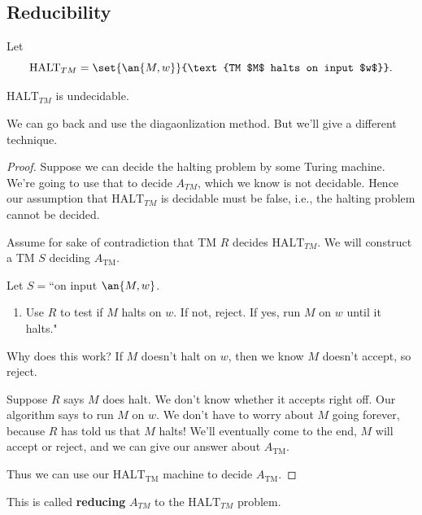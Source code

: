 \subsection{Reducibility}
Let
\[
\text{HALT}_{TM}=\set{\an{M,w}}{\text{TM $M$ halts on input $w$}}.
\]
\begin{thm}
$\text{HALT}_{TM}$ is undecidable.
\end{thm}
We can go back and use the diagaonlization method. But we'll give a different technique.
\begin{proof}
Suppose we can decide the halting problem by some Turing machine. We're going to use that to decide $A_{TM}$, which we know is not decidable. Hence our assumption that $\text{HALT}_{TM}$ is decidable must be false, i.e., the halting problem cannot be decided.

Assume for sake of contradiction that TM $R$ decides $\text{HALT}_{TM}$. We will construct a TM $S$ deciding $A_{\text{TM}}$.

Let $S=$``on input $\an{M,w}$. 
\begin{enumerate}
\item
Use $R$ to test if $M$ halts on $w$. If not, reject. %
If yes, run $M$ on $w$ until it halts." %
\end{enumerate}
Why does this work?
If $M$ doesn't halt on $w$, %
then we know $M$ doesn't accept, so reject. %

Suppose $R$ says $M$ does halt. We don't know whether it accepts right off. Our algorithm says to run $M$ on $w$. We don't have to worry about $M$ going forever, because $R$ has told us that $M$ halts! We'll eventually come to the end, $M$ will accept or reject, and we can give our answer about $A_{\text{TM}}$.


Thus we can use our $\text{HALT}_{\text{TM}}$ machine to decide $A_{\text{TM}}$.
\end{proof}
This is called \textbf{reducing} $A_{TM}$ to the $\text{HALT}_{TM}$ problem.\\

